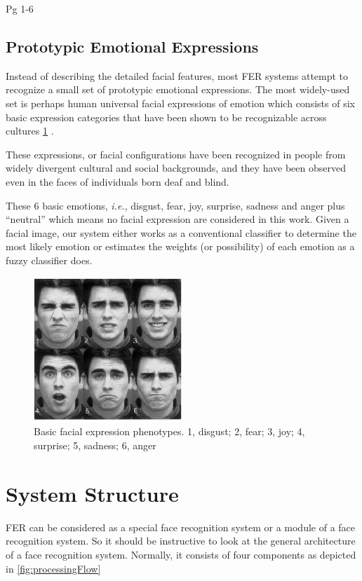 \documentclass[12pt, twoside]{report}
\begin{document}
Pg 1-6

\subsection*{Prototypic Emotional Expressions}
Instead of describing the detailed facial features, most FER systems attempt to recognize a small set of prototypic emotional expressions. The most widely-used set is perhaps human universal facial expressions of emotion which consists of six basic expression categories that have been shown to be recognizable across cultures \ref{fig:facialPhenotypes} .

These expressions, or facial configurations have been recognized in people from widely divergent cultural and social backgrounds, and they have been observed even in the faces of individuals born deaf and blind.

These 6 basic emotions, \textit{i.e.}, disgust, fear, joy, surprise, sadness and anger plus ``neutral'' which means no facial expression are considered in this work. Given a facial image, our system either works as a conventional classifier to determine the most likely emotion or estimates the weights (or possibility) of each emotion as a fuzzy classifier does.

\begin{figure}[h]
    \centering
    \includegraphics[width=0.5\textwidth]{img/facialPhenotypes.png}
    \caption{Basic facial expression phenotypes. 1, disgust; 2, fear; 3, joy; 4, surprise; 5, sadness; 6, anger}
    \label{fig:facialPhenotypes}
\end{figure}

\section{System Structure}
FER can be considered as a special face recognition system or a module of a face recognition system. So it should be instructive to look at the general architecture of a face recognition system. Normally, it consists of four components as depicted in \ref{fig:processingFlow}
\end{document}
